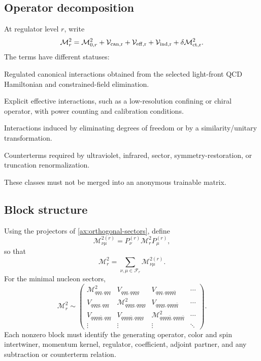 \documentclass[11pt]{article}
\newcommand{\cM}{\mathcal M}
\newcommand{\cV}{\mathcal V}
\newcommand{\cF}{\mathcal F}
\begin{document}
\subsection{Operator decomposition}

At regulator level \(r\), write
\begin{equation}
 \cM_r^2
 =\cM_{0,r}^2
 +\cV_{\rm can,r}
 +\cV_{\rm eff,r}
 +\cV_{\rm ind,r}
 +\delta\cM_{\rm ct,r}^2.
\label{eq:mass-decomposition}
\end{equation}
The terms have different statuses:
\begin{description}[leftmargin=3.2cm,style=nextline]
\item[\(\cV_{\rm can,r}\)] Regulated canonical interactions obtained from
the selected light-front QCD Hamiltonian and constrained-field elimination.
\item[\(\cV_{\rm eff,r}\)] Explicit effective interactions, such as a
low-resolution confining or chiral operator, with power counting and
calibration conditions.
\item[\(\cV_{\rm ind,r}\)] Interactions induced by eliminating degrees of
freedom or by a similarity/unitary transformation.
\item[\(\delta\cM_{\rm ct,r}^2\)] Counterterms required by ultraviolet,
infrared, sector, symmetry-restoration, or truncation renormalization.
\end{description}
These classes must not be merged into an anonymous trainable matrix.

\subsection{Block structure}

Using the projectors of \cref{ax:orthogonal-sectors}, define
\begin{equation}
 \cM_{\nu\mu}^{2(r)}
 =P_\nu^{(r)}\cM_r^2P_\mu^{(r)},
\label{eq:mass-block}
\end{equation}
so that
\begin{equation}
 \cM_r^2
 =\sum_{\nu,\mu\in\cF_r}\cM_{\nu\mu}^{2(r)}.
\label{eq:mass-block-sum}
\end{equation}
For the minimal nucleon sectors,
\begin{equation}
 \cM_r^2\sim
 \begin{pmatrix}
 \cM_{qqq,qqq}^2 & V_{qqq,qqqg} & V_{qqq,qqqq\bar q} & \cdots\\
 V_{qqqg,qqq} & \cM_{qqqg,qqqg}^2 & V_{qqqg,qqqq\bar q} & \cdots\\
 V_{qqqq\bar q,qqq} & V_{qqqq\bar q,qqqg} &
 \cM_{qqqq\bar q,qqqq\bar q}^2 & \cdots\\
 \vdots&\vdots&\vdots&\ddots
 \end{pmatrix}.
\label{eq:nucleon-block-matrix}
\end{equation}
Each nonzero block must identify the generating operator, color and spin
intertwiner, momentum kernel, regulator, coefficient, adjoint partner, and
any subtraction or counterterm relation.
\end{document}
